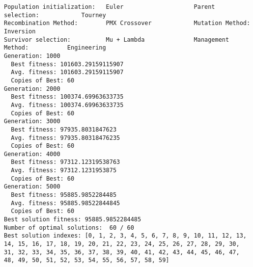 \documentclass[11pt]{article}
\begin{document}
    \begin{Verbatim}[commandchars=\\\{\}]
Population initialization:   Euler                    Parent selection:            Tourney                  
Recombination Method:        PMX Crossover            Mutation Method:             Inversion                
Survivor selection:          Mu + Lambda              Management Method:           Engineering              
Generation: 1000
  Best fitness: 101603.29159115907
  Avg. fitness: 101603.29159115907
  Copies of Best: 60
Generation: 2000
  Best fitness: 100374.69963633735
  Avg. fitness: 100374.69963633735
  Copies of Best: 60
Generation: 3000
  Best fitness: 97935.8031847623
  Avg. fitness: 97935.80318476235
  Copies of Best: 60
Generation: 4000
  Best fitness: 97312.12319538763
  Avg. fitness: 97312.1231953875
  Copies of Best: 60
Generation: 5000
  Best fitness: 95885.9852284485
  Avg. fitness: 95885.98522844845
  Copies of Best: 60
Best solution fitness: 95885.9852284485
Number of optimal solutions:  60 / 60
Best solution indexes: [0, 1, 2, 3, 4, 5, 6, 7, 8, 9, 10, 11, 12, 13, 14, 15, 16, 17, 18, 19, 20, 21, 22, 23, 24, 25, 26, 27, 28, 29, 30, 31, 32, 33, 34, 35, 36, 37, 38, 39, 40, 41, 42, 43, 44, 45, 46, 47, 48, 49, 50, 51, 52, 53, 54, 55, 56, 57, 58, 59]

\end{Verbatim}
\end{document}
